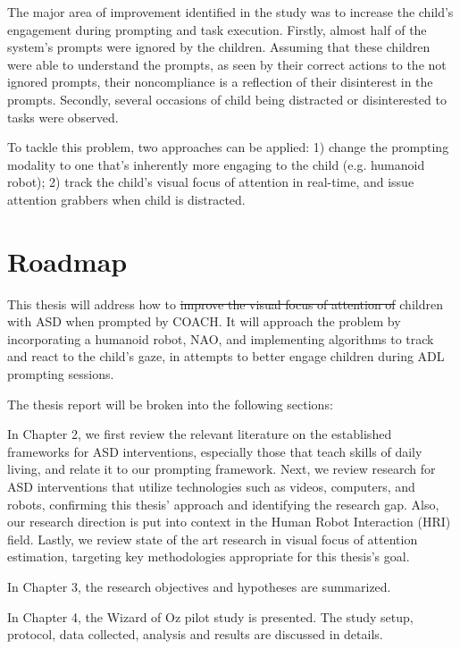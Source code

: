 \documentclass{ut-thesis}
\providecommand{\DIFaddtex}[1]{{\protect\color{blue}\uwave{#1}}} %
\providecommand{\DIFdeltex}[1]{{\protect\color{red}\sout{#1}}}                      %
\providecommand{\DIFaddbegin}{} %
\providecommand{\DIFaddend}{} %
\providecommand{\DIFdelbegin}{} %
\providecommand{\DIFdelend}{} %
\providecommand{\DIFadd}[1]{\texorpdfstring{\DIFaddtex{#1}}{#1}} %
\providecommand{\DIFdel}[1]{\texorpdfstring{\DIFdeltex{#1}}{}} %
\begin{document}
The major area of improvement identified in the study was to increase the child's engagement during prompting and task execution.  Firstly, almost half of the system's prompts were ignored by the children.  Assuming that these children were able to understand the prompts, as seen by their correct actions to the not ignored prompts, their noncompliance is a reflection of their disinterest in the prompts.  Secondly, several occasions of child being distracted or disinterested to tasks were observed.


To tackle this problem, two \DIFaddbegin \DIFadd{potential }\DIFaddend approaches can be applied: 1) change the prompting modality to one that's inherently more engaging to the child (e.g. humanoid robot); 2) track the child's visual focus of attention in real-time, and issue attention grabbers when child is distracted.

\section{Roadmap}

This thesis will address how to \DIFdelbegin \DIFdel{improve the visual focus of attention of }\DIFdelend \DIFaddbegin \DIFadd{better engage }\DIFaddend children with ASD when prompted by COACH.  It will approach the problem by incorporating a humanoid robot, NAO, and implementing algorithms to track and react to the child's gaze, in attempts to better engage children during ADL prompting sessions.


The thesis report will be broken into the following sections:


In Chapter 2, we first review the relevant literature on the established frameworks for ASD interventions, especially those that teach skills of daily living, and relate it to our prompting framework.  Next, we review research for ASD interventions that utilize technologies such as videos, computers, and robots, confirming this thesis' approach and identifying the research gap.  Also, our research direction is put into context in the Human Robot Interaction (HRI) field.  Lastly, we review state of the art research in visual focus of attention estimation, targeting key methodologies appropriate for this thesis's goal.


In Chapter 3, the research objectives and hypotheses are summarized.

In Chapter 4, the Wizard of Oz pilot study is presented.  The study setup, protocol, data collected, analysis and results are discussed in details.
\end{document}
